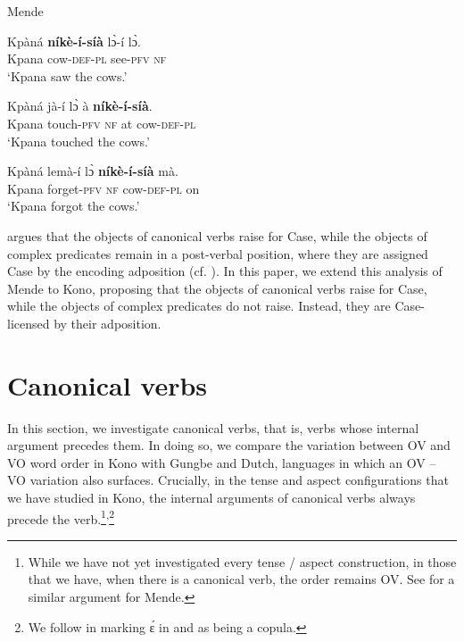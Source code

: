 \documentclass[output=paper,colorlinks,citecolor=brown,draftmode
]{langscibook}
\begin{document}
\newpage
\ea \label{ex:Mende:3 Classes}
Mende
\begin{xlist}

\ex \label{ex:Mende:Canonical}
\gll Kpàná \textbf{níkè-í-síà} lɔ̀-í lɔ̀. \\
Kpana cow-\textsc{def}-\textsc{pl} see-\textsc{pfv} \textsc{nf}  \\
\glt `Kpana saw the cows.'

\ex \label{ex:Mende:aV}
\gll Kpàná jà-í lɔ̀ à \textbf{níkè-í-síà}. \\
Kpana touch-\textsc{pfv} \textsc{nf} at cow-\textsc{def}-\textsc{pl} \\
\glt `Kpana touched the cows.'

\ex \label{ex:Mende:maV}
\gll Kpàná lemà-í lɔ̀ \textbf{níkè-í-síà} mà. \\
Kpana forget-\textsc{pfv} \textsc{nf} cow-\textsc{def}-\textsc{pl} on \\
\glt `Kpana forgot the cows.'

\end{xlist}
\z 



\citet{SmithCLS, SmithDiss} argues that the objects of canonical verbs raise for Case, while the objects of complex predicates remain in a post-verbal position, where they are assigned Case by the encoding adposition (cf. \citealt{stowell1981origins, mcfadden2004position, asbury2008morphosyntax}). In this paper, we extend this analysis of Mende to Kono, proposing that the objects of canonical verbs raise for Case, while the objects of complex predicates do not raise. Instead, they are Case-licensed by their adposition. 



\section{Canonical verbs}
\label{sec:Canonical Verbs}
In this section, we investigate canonical verbs, that is, verbs whose internal argument precedes them. In doing so, we compare the variation between OV and VO word order in Kono with Gungbe and Dutch, languages in which  an OV – VO variation also surfaces. Crucially, in the tense and aspect configurations that we have studied in Kono, the internal arguments of canonical verbs always precede the verb.\footnote{While we have not yet investigated every tense / aspect construction, in those that we have, when there is a canonical verb, the order remains OV. See \citet{SmithDiss} for a similar argument for Mende.}\textsuperscript{,}\footnote{We follow \citet{kaiser2011grammar} in marking ɛ́ in  and  as being a copula.}
\end{document}
